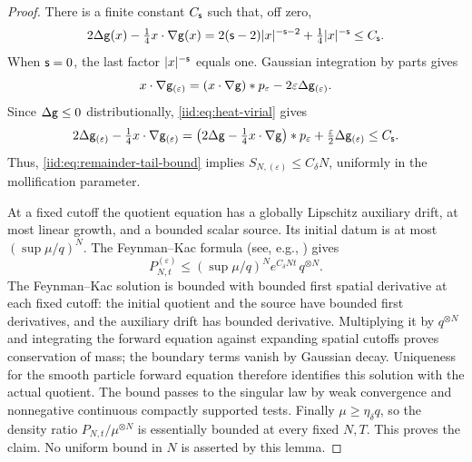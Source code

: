 \documentclass[11pt,reqno]{amsart}
\numberwithin{equation}{section}
\theoremstyle{plain}
\theoremstyle{remark}
\begin{document}
\begin{proof}
There is a finite constant $C_{\mathsf{s}}$ such that, off zero,
\begin{equation}\label{iid:eq:radial-source-bound}
 2\Delta\mathsf g(x)-\tfrac14x\cdot\nabla\mathsf g(x)
 =2(\mathsf{s}-2)|x|^{-\mathsf{s}-2}+\tfrac14|x|^{-\mathsf{s}}\le C_{\mathsf{s}}.
\end{equation}
When $\mathsf{s}=0$, the last factor $|x|^{-\mathsf{s}}$ equals one. Gaussian integration by parts gives
\begin{equation}\label{iid:eq:heat-virial}
 x\cdot\nabla\mathsf g_{(\varepsilon)}
 =(x\cdot\nabla\mathsf g)*p_\varepsilon-2\varepsilon\Delta\mathsf g_{(\varepsilon)}.
\end{equation}
Since $\Delta\mathsf g\le0$ distributionally, \eqref{iid:eq:heat-virial} gives
\begin{equation}\label{iid:eq:mollified-radial-source}
 2\Delta\mathsf g_{(\varepsilon)}-\tfrac14x\cdot\nabla\mathsf g_{(\varepsilon)}
 =\left(2\Delta\mathsf g-\tfrac14x\cdot\nabla\mathsf g\right)*p_\varepsilon
   +\tfrac\varepsilon2\Delta\mathsf g_{(\varepsilon)}\le C_{\mathsf{s}}.
\end{equation}
Thus, \eqref{iid:eq:remainder-tail-bound} implies $S_{N,(\varepsilon)}\le C_\delta N$, uniformly in the mollification parameter.

At a fixed cutoff the quotient equation has a globally Lipschitz auxiliary drift, at most linear growth, and a bounded scalar source. Its initial datum is at most $(\sup\mu/q)^N$. The Feynman--Kac formula (see, e.g., \cite[Section 8.2]{Oksendal}) gives
\begin{equation}\label{iid:eq:Gaussian-cutoff-domination}
 P_{N,t}^{(\varepsilon)}\le (\sup\mu/q)^N e^{C_\delta Nt}\,q^{\otimes N}.
\end{equation}
The Feynman--Kac solution is bounded with bounded first spatial derivative at each fixed cutoff: the initial quotient and the source have bounded first derivatives, and the auxiliary drift has bounded derivative. Multiplying it by $q^{\otimes N}$ and integrating the forward equation against expanding spatial cutoffs proves conservation of mass; the boundary terms vanish by Gaussian decay. Uniqueness for the smooth particle forward equation therefore identifies this solution with the actual quotient. The bound passes to the singular law by weak convergence and nonnegative continuous compactly supported tests. Finally $\mu\ge\eta_\delta q$, so the density ratio $P_{N,t}/\mu^{\otimes N}$ is essentially bounded at every fixed $N,T$. This proves the claim. No uniform bound in $N$ is asserted by this lemma.
\end{proof}
\end{document}
